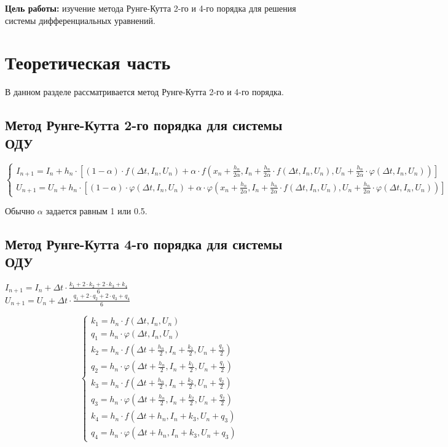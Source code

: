 \documentclass[a4paper, 14pt]{article}
\begin{document}
	\textbf{Цель работы:} изучение метода Рунге-Кутта 2-го и 4-го порядка для решения системы дифференциальных уравнений.\\
	
	
	\section{Теоретическая часть}
	
	В данном разделе рассматривается метод Рунге-Кутта 2-го и 4-го порядка.
	
	\subsection{Метод Рунге-Кутта 2-го порядка для системы ОДУ}
	
	\begin{equation*}
\begin{cases}
I_{n+1} = I_n + h_n \cdot [(1 - \alpha) \cdot f(\Delta t, I_n, U_n) + \alpha \cdot f(x_n + \frac{h_n}{2 \alpha}, I_n + \frac{h_n}{2 \alpha} \cdot f(\Delta t, I_n, U_n), U_n + \frac{h_n}{2 \alpha} \cdot \varphi(\Delta t, I_n, U_n))]
\\ 
U_{n+1} = U_n + h_n \cdot [(1 - \alpha) \cdot \varphi(\Delta t, I_n, U_n) + \alpha \cdot \varphi(x_n + \frac{h_n}{2 \alpha}, I_n + \frac{h_n}{2 \alpha} \cdot f(\Delta t, I_n, U_n), U_n + \frac{h_n}{2 \alpha} \cdot \varphi(\Delta t, I_n, U_n))]
\end{cases}
\end{equation*}

Обычно $\alpha$ задается равным 1 или 0.5.
	
	\subsection{Метод Рунге-Кутта 4-го порядка для системы ОДУ}
	
	$I_{n+1} = I_n + \Delta t \cdot \frac{k_1 + 2 \cdot k_2 + 2 \cdot k_3 + k_4 }{6}$\\
	$U_{n+1} = U_n + \Delta t \cdot \frac{q_1 + 2 \cdot q_2 + 2 \cdot q_3 + q_4 }{6}$
	
		\begin{equation*}
\begin{cases} k_1 = h_n \cdot f(\Delta t, I_n, U_n) 
\\ q_1 = h_n \cdot \varphi (\Delta t, I_n, U_n)
\\ k_2 = h_n \cdot f(\Delta t + \frac{h_n}{2}, I_n  + \frac{k_1}{2}, U_n + \frac{q_1}{2})
\\ q_2 = h_n \cdot \varphi(\Delta t + \frac{h_n}{2}, I_n  + \frac{k_1}{2}, U_n + \frac{q_1}{2})  
\\ k_3 = h_n \cdot f(\Delta t + \frac{h_n}{2}, I_n  + \frac{k_2}{2}, U_n + \frac{q_2}{2})
\\ q_3 = h_n \cdot \varphi(\Delta t + \frac{h_n}{2}, I_n  + \frac{k_2}{2}, U_n + \frac{q_2}{2})
\\ k_4 = h_n \cdot f(\Delta t + h_n, I_n  + k_3, U_n + q_3)  
\\ q_4 = h_n \cdot \varphi(\Delta t + h_n, I_n  + k_3, U_n + q_3) 
\end{cases}
\end{equation*}
	
\end{document}
